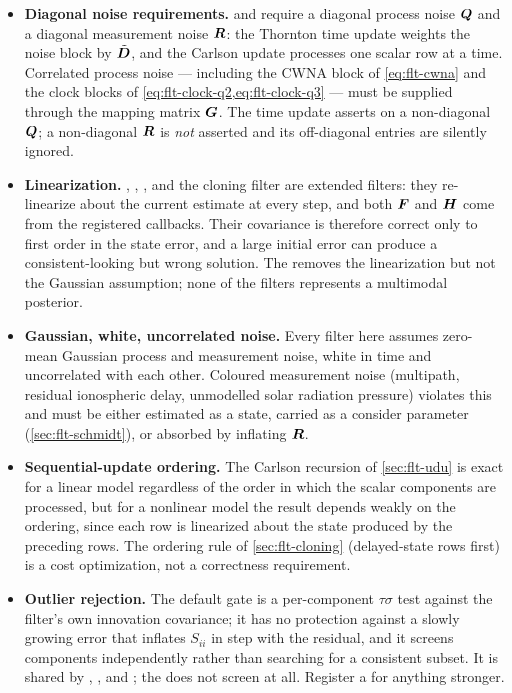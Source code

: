 \begin{itemize}[leftmargin=1.4em]
  \item \textbf{Diagonal noise requirements.}  and
     require a diagonal process noise $\bm{Q}$
    and a diagonal measurement noise $\bm{R}$: the Thornton time update
    weights the noise block by $\tilde{\bm{D}}$, and the Carlson update
    processes one scalar row at a time. Correlated process noise --- including
    the CWNA block of \cref{eq:flt-cwna} and the clock blocks of
    \cref{eq:flt-clock-q2,eq:flt-clock-q3} --- must be supplied through the
    mapping matrix $\bm{G}$. The time update asserts on a non-diagonal
    $\bm{Q}$; a non-diagonal $\bm{R}$ is \emph{not} asserted and its
    off-diagonal entries are silently ignored.

  \item \textbf{Linearization.} , , , and the
    cloning filter are extended filters: they re-linearize about the current
    estimate at every step, and both $\bm{F}$ and $\bm{H}$ come from the
    registered callbacks. Their covariance is therefore correct only to first
    order in the state error, and a large initial error can produce a
    consistent-looking but wrong solution. The  removes the
    linearization but not the Gaussian assumption; none of the filters
    represents a multimodal posterior.

  \item \textbf{Gaussian, white, uncorrelated noise.} Every filter here assumes
    zero-mean Gaussian process and measurement noise, white in time and
    uncorrelated with each other. Coloured measurement noise (multipath,
    residual ionospheric delay, unmodelled solar radiation pressure) violates
    this and must be either estimated as a state, carried as a consider
    parameter (\cref{sec:flt-schmidt}), or absorbed by inflating $\bm{R}$.

  \item \textbf{Sequential-update ordering.} The Carlson recursion of
    \cref{sec:flt-udu} is exact for a linear model regardless of the order in
    which the scalar components are processed, but for a nonlinear model the
    result depends weakly on the ordering, since each row is linearized about
    the state produced by the preceding rows. The ordering rule of
    \cref{sec:flt-cloning} (delayed-state rows first) is a cost optimization,
    not a correctness requirement.

  \item \textbf{Outlier rejection.} The default gate is a per-component
    $\tau\sigma$ test against the filter's own innovation covariance; it has no
    protection against a slowly growing error that inflates $S_{ii}$ in step
    with the residual, and it screens components independently rather than
    searching for a consistent subset. It is shared by , ,
    and ; the  does not screen at all. Register a
     for anything stronger.


\end{itemize}
